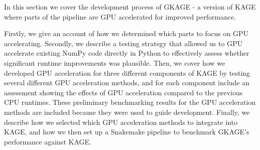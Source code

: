 In this section we cover the development process of GKAGE - a version of KAGE where parts of the pipeline are GPU accelerated for improved performance. 

Firstly, we give an account of how we determined which parts to focus on GPU accelerating. 
Secondly, we describe a testing strategy that allowed us to GPU accelerate existing NumPy code directly in Python to effectively assess whether significant runtime improvements was plausible.
Then, we cover how we developed GPU acceleration for three different components of KAGE by testing several different GPU acceleration methods, and for each component include an assessment showing the effects of GPU acceleration compared to the previous CPU runtimes.
These preliminary benchmarking results for the GPU acceleration methods are included because they were used to guide development.
Finally, we describe how we selected which GPU acceleration methods to integrate into KAGE, and how we then set up a Snakemake \cite{snakemake} pipeline to benchmark GKAGE's performance against KAGE.

